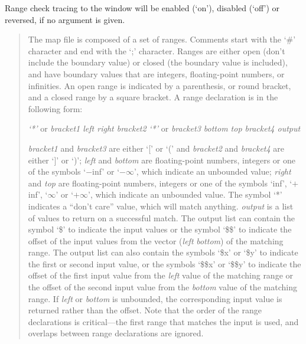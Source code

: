   Range check tracing to the \MaxName{} window will be enabled (`on'), disabled (`off') or reversed,
  if no argument is given.
  
  \objListCmdEnd

\objItemFile[]

\begin{quote}
The map file is composed of a set of ranges.
Comments start with the `\#' character and end with the `;' character.
Ranges are either open (don't include the boundary value) or closed (the boundary value is included),
and have boundary values that are integers, floating-point numbers, or infinities.
An open range is indicated by a parenthesis, or round bracket, and a closed range by a square bracket.
A range declaration is in the following form:

\centerline{\emph{`*'} or \emph{bracket1 left right bracket2} \emph{`*'} or \emph{bracket3 bottom top bracket4 output}}

\emph{bracket1} and \emph{bracket3} are either `[' or `(' and \emph{bracket2} and \emph{bracket4} are
either `]' or `)';
\emph{left} and \emph{bottom} are floating-point numbers, integers or one of the symbols `$-$inf' or
`$-\infty$', which indicate an unbounded value;
\emph{right} and \emph{top} are floating-point numbers, integers or one of the symbols `inf', `$+$inf',
`$\infty$' or `$+\infty$', which indicate an unbounded value.
The symbol `*' indicates a ``don't care'' value, which will match anything.
\emph{output} is a list of values to return on a successful match.
The output list can contain the symbol `\$' to indicate the input values or the symbol `\$\$' to
indicate the offset of the input values from the vector (\emph{left} \emph{bottom}) of the matching range.
The output list can also contain the symbols `\$x' or `\$y' to indicate the first or second input value, or
the symbols `\$\$x' or `\$\$y' to indicate the offset of the first input value from the \emph{left} value of the
matching range or the offset of the second input value from the \emph{bottom} value of the matching range.
If \emph{left} or \emph{bottom} is unbounded, the corresponding input value is returned rather than the offset.
Note that the order of the range declarations is critical---the first range that matches the input
is used, and overlaps between range declarations are ignored.
\end{quote}

\objItemMessage

